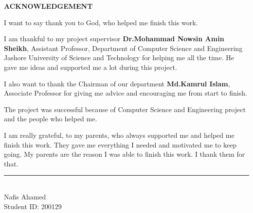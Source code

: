 
\newpage
\begin{center}
    \Large \textbf{ACKNOWLEDGEMENT}
\end{center}

\vspace{1cm}

\noindent I want to say thank you to God, who helped me finish this work.

\vspace{0.5cm}

\noindent I am thankful to my project supervisor \textbf{Dr.Mohammad Nowsin Amin Sheikh}, Assistant Professor, Department of Computer Science and Engineering Jashore University of Science and Technology for helping me all the time. He gave me ideas and supported me a lot during this project.

\vspace{0.5cm}

\noindent I also want to thank the Chairman of our department \textbf{Md.Kamrul Islam}, Associate Professor for giving me advice and encouraging me from start to finish.

\vspace{0.5cm}

\noindent The project was successful because of Computer Science and Engineering project and the people who helped me.

\vspace{0.5cm}

\noindent I am really grateful, to my parents, who always supported me and helped me finish this work. They gave me everything I needed and motivated me to keep going. My parents are the reason I was able to finish this work. I thank them for that.

\vspace{2cm}

\noindent
\begin{minipage}[t]{0.4\textwidth}
    \rule{5cm}{0.4pt} \\
    {Nafis Ahamed} \\
    Student ID: 200129
\end{minipage}